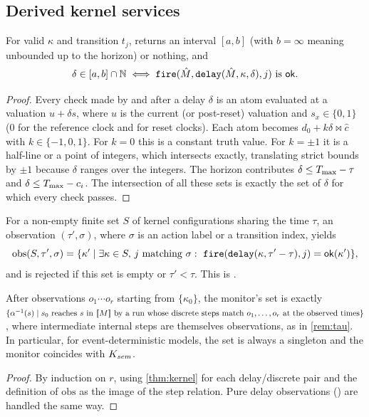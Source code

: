 \subsection{Derived kernel services}

\begin{lemma}\label{lem:window}
For valid $\kappa$ and transition $t_j$,  returns an interval
$[a,b]$ (with $b=\infty$ meaning unbounded up to the horizon) or nothing, and
\[
  \delta\in[a,b]\cap\mathbb{N} \iff \texttt{fire}(\hat M,\texttt{delay}(\hat M,\kappa,\delta),j)\text{ is }\mathsf{ok} .
\]
\end{lemma}
\begin{proof}
Every check made by  and  after a delay $\delta$ is an atom
evaluated at a valuation $u+\delta s$, where $u$ is the current (or post-reset)
valuation and $s_x\in\{0,1\}$ (0 for the reference clock and for reset clocks).
Each atom becomes $d_0+k\delta\bowtie\hat c$ with $k\in\{-1,0,1\}$. For $k=0$ this is a
constant truth value. For $k=\pm1$ it is a half-line or a point of integers, which
 intersects exactly, translating strict bounds by $\pm1$
because $\delta$ ranges over the integers. The horizon contributes
$\delta\le T_{\max}-\tau$ and $\delta\le T_{\max}-c_i$. The intersection of all these sets is
exactly the set of $\delta$ for which every check passes.
\end{proof}

\begin{definition}\label{def:monitor}
For a non-empty finite set $S$ of kernel configurations sharing the time $\tau$,
an observation $(\tau',\sigma)$, where $\sigma$ is an action label or a transition
index, yields
\[
  \mathrm{obs}(S,\tau',\sigma)=\{\kappa'\mid \exists\kappa\in S,\,j\text{ matching }\sigma:\
    \texttt{fire}(\texttt{delay}(\kappa,\tau'-\tau),j)=\mathsf{ok}(\kappa')\},
\]
and is rejected if this set is empty or $\tau'<\tau$. This is .
\end{definition}

\begin{proposition}\label{prop:monitor}
After observations $o_1\cdots o_r$ starting from $\{\kappa_0\}$, the monitor's
set is exactly
$\{\alpha^{-1}(s)\mid s_0\text{ reaches }s\text{ in }\llbracket M \rrbracket\text{ by a run whose discrete
steps match }o_1,\dots,o_r\text{ at the observed times}\}$, where intermediate
internal steps are themselves observations, as in \cref{rem:tau}. In particular,
for event-deterministic models, the set is always a singleton and the monitor
coincides with $K_{\mathit{sem}}$.
\end{proposition}
\begin{proof}
By induction on $r$, using \cref{thm:kernel} for each delay/discrete pair and
the definition of $\mathrm{obs}$ as the image of the step relation. Pure delay
observations (\code{advance\_to}) are handled the same way.
\end{proof}

